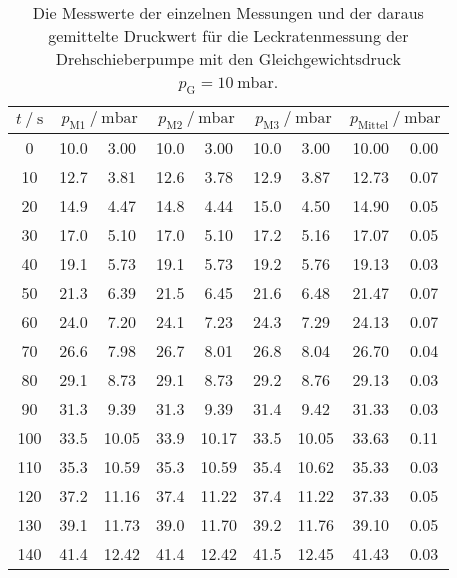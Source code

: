     \begin{table}[h]
      \centering
      \caption{Die Messwerte der einzelnen Messungen und der daraus gemittelte Druckwert für die Leckratenmessung der Drehschieberpumpe mit den 
      Gleichgewichtsdruck $p_\text{G} = \SI{10}{\milli\bar}$.}
      \label{tab:dreh_leck_10}
      \begin{tabular}{S[table-format=3.0] S @{${}\pm{}$} S[table-format=2.2] S @{${}\pm{}$} S[table-format=2.2] S @{${}\pm{}$} S[table-format=2.2] S[table-format=2.2] @{${}\pm{}$} S[table-format=1.2]}
      \toprule
      {$t \mathbin{/} \si{\second} $} &  &  &  &  \\
       & 10.0 &  3.00 & 10.0 &  3.00 & 10.0 &  3.00 & 10.00 & 0.00 \\  
       10 & 12.7 &  3.81 & 12.6 &  3.78 & 12.9 &  3.87 & 12.73 & 0.07 \\
       20 & 14.9 &  4.47 & 14.8 &  4.44 & 15.0 &  4.50 & 14.90 & 0.05 \\
       30 & 17.0 &  5.10 & 17.0 &  5.10 & 17.2 &  5.16 & 17.07 & 0.05 \\
       40 & 19.1 &  5.73 & 19.1 &  5.73 & 19.2 &  5.76 & 19.13 & 0.03 \\
       50 & 21.3 &  6.39 & 21.5 &  6.45 & 21.6 &  6.48 & 21.47 & 0.07 \\
       60 & 24.0 &  7.20 & 24.1 &  7.23 & 24.3 &  7.29 & 24.13 & 0.07 \\
       70 & 26.6 &  7.98 & 26.7 &  8.01 & 26.8 &  8.04 & 26.70 & 0.04 \\
       80 & 29.1 &  8.73 & 29.1 &  8.73 & 29.2 &  8.76 & 29.13 & 0.03 \\
       90 & 31.3 &  9.39 & 31.3 &  9.39 & 31.4 &  9.42 & 31.33 & 0.03 \\
      100 & 33.5 & 10.05 & 33.9 & 10.17 & 33.5 & 10.05 & 33.63 & 0.11 \\
      110 & 35.3 & 10.59 & 35.3 & 10.59 & 35.4 & 10.62 & 35.33 & 0.03 \\
      120 & 37.2 & 11.16 & 37.4 & 11.22 & 37.4 & 11.22 & 37.33 & 0.05 \\
      130 & 39.1 & 11.73 & 39.0 & 11.70 & 39.2 & 11.76 & 39.10 & 0.05 \\
      140 & 41.4 & 12.42 & 41.4 & 12.42 & 41.5 & 12.45 & 41.43 & 0.03 \\

\end{tabular}
\end{table}
